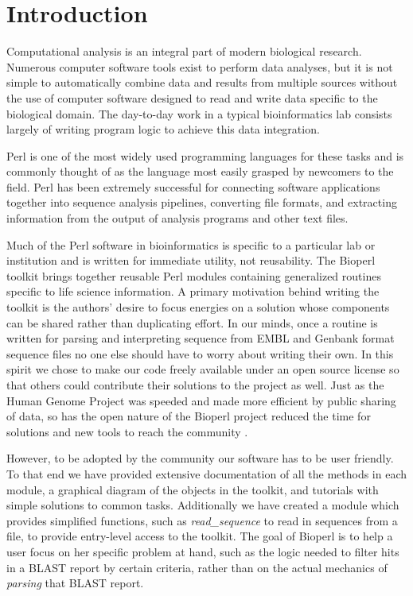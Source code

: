 \documentclass[12pt]{article}
\begin{document}
\section{Introduction}

Computational analysis is an integral part of modern biological
research.  Numerous computer software tools exist to perform data
analyses, but it is not simple to automatically combine data and
results from multiple sources without the use of computer software
designed to read and write data specific to the biological domain.
The day-to-day work in a typical bioinformatics lab consists largely
of writing program logic to achieve this data integration.

Perl is one of the most widely used programming languages for these
tasks and is commonly thought of as the language most easily grasped
by newcomers to the field.  Perl has been extremely successful for
connecting software applications together into sequence analysis
pipelines, converting file formats, and extracting information from
the output of analysis programs and other text files.

Much of the Perl software in bioinformatics is specific to a
particular lab or institution and is written for immediate
utility, not reusability.  The Bioperl toolkit brings together
reusable Perl modules containing generalized routines specific to life
science information.  A primary motivation behind writing the toolkit
is the authors' desire to focus energies on a solution whose
components can be shared rather than duplicating effort.  In our
minds, once a routine is written for parsing and interpreting sequence
from EMBL and Genbank format sequence files no one else should have
to worry about writing their own.  In this spirit we chose to make our
code freely available under an open source license
\cite{open-source-ref} so that others could contribute their solutions
to the project as well.  Just as the Human Genome Project was speeded
and made more efficient by public sharing of data, so has the open
nature of the Bioperl project reduced the time for solutions and new
tools to reach the community \cite{waterston}.

However, to be adopted by the community our software has to be user
friendly.  To that end we have provided extensive documentation
of all the methods in each module, a graphical diagram of the objects
in the toolkit, and tutorials with simple solutions to common tasks.
Additionally we have created a module which provides
simplified functions, such as \textit{read\_sequence} to read
in sequences from a file, to provide entry-level access to the toolkit.
The goal of Bioperl is to help a user focus
on her specific problem at hand, such as the logic needed to filter
hits in a BLAST \cite{blast} report by certain criteria, rather than
on the actual mechanics of \textit{parsing} that BLAST report.
\end{document}
